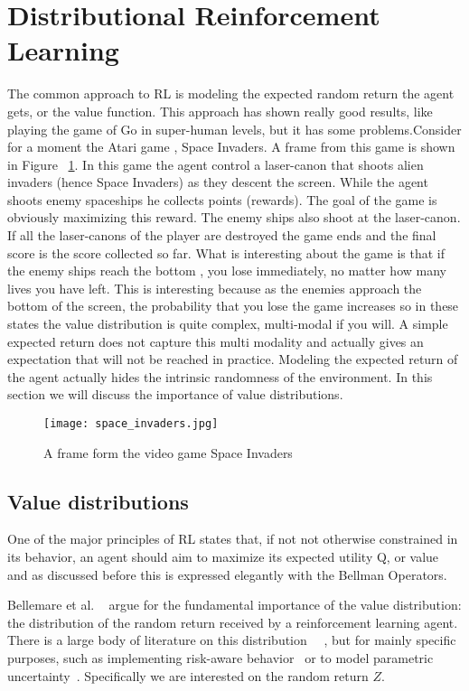 \section{Distributional Reinforcement Learning} \label{distributional_rl_section}
The common approach to RL is modeling the expected random return the agent gets, or the value function. This approach has shown really good results, like playing the game of Go in super-human levels, but it has some  problems.Consider for a moment the Atari game , Space Invaders. A frame from this game is shown in Figure ~\ref{fig:space_invaders}. In this game the agent control a laser-canon that shoots alien invaders (hence Space Invaders) as they descent the screen. While the agent shoots enemy spaceships he collects points (rewards). The goal of the game is obviously maximizing this reward. The enemy ships also shoot at the laser-canon. If all the laser-canons of the player are destroyed the game ends and the final score is the score collected so far. What is interesting about the game is that if the enemy ships reach the bottom , you lose immediately, no matter how many lives you have left. This is interesting because as the enemies approach the bottom of the screen, the probability that you lose the game increases so in these states the value distribution is quite complex, multi-modal if you will. A simple expected return does not capture this multi modality and actually gives an expectation that will not be reached in practice. Modeling the expected return of the agent actually hides the intrinsic randomness of the environment. In this section we will discuss the importance of value distributions.
\begin{figure}
  \texttt{[image: space\_invaders.jpg]}
  \caption{A frame form the video game Space Invaders }
  \label{fig:space_invaders}
\end{figure}
\subsection{Value distributions}
One of the major principles of RL states that, if not not otherwise constrained in its behavior, an agent should aim to maximize its expected utility Q, or value~\cite{Sutton:1998:IRL:551283} and as discussed before this is expressed elegantly with the Bellman Operators.\par
Bellemare et al. ~\cite{DBLP:journals/corr/BellemareDM17} argue for the fundamental importance of the value distribution:  the distribution of the random return received by a reinforcement learning  agent. There is a large body of literature on this distribution~\cite{jaquette1973}~\cite{articleSobel} , but for mainly specific purposes, such as implementing risk-aware behavior~\cite{Morimura:2010:NRD:3104322.3104424} or to model parametric uncertainty~\cite{Dearden98bayesianq-learning}. Specifically we are interested on the random return $Z$.\par
